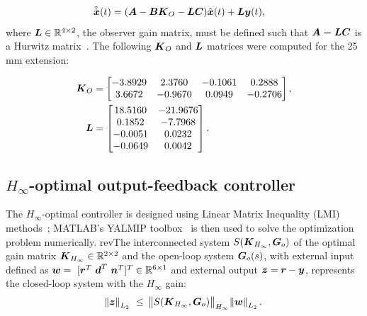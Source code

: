 \begin{align}
&\hat{\dot{\boldsymbol{x}}}(t)=(\boldsymbol{A}-\boldsymbol{B}\boldsymbol{K}_O-\boldsymbol{LC})\hat{\boldsymbol{x}}(t)+\boldsymbol{L}\boldsymbol{y}(t), \label{eq:obs-estimate}
\end{align}
where $\boldsymbol{L}\in \mathbb{R}^{4\times2}$, the observer gain matrix, must be defined such that $\boldsymbol{A-LC}$ is a Hurwitz matrix~\cite{aastrom2010}.
The following $\boldsymbol{K}_O$ and $\boldsymbol{L}$ matrices were computed for the 25\,mm extension: 

\begin{align*}
\boldsymbol{K}_O &=\begin{bmatrix}  
            -3.8929  & 2.3760   &  -0.1061  &  0.2888\\
             3.6672  & -0.9670  &   0.0949  & -0.2706
    \end{bmatrix},\\
\boldsymbol{L} &=\begin{bmatrix}
           18.5160 &  -21.9676\\   
            0.1852 &  -7.7968\\
           -0.0051 &   0.0232\\
           -0.0649 &   0.0042\\
    \end{bmatrix}.
\end{align*}

\subsection{$H_\infty$-optimal output-feedback controller}

The $H_\infty$-optimal controller is designed using Linear Matrix Inequality (LMI) methods~\cite{duan2013,boyd1994}; MATLAB's YALMIP toolbox~\cite{Lofberg2004} is then used to solve the optimization problem numerically. rev{The interconnected system $S(\boldsymbol{K}_{H_{\infty}},\boldsymbol{G}_o)$ of the optimal gain matrix $\boldsymbol{K}_{H_{\infty}}\in \mathbb{R}^{2\times2}$ and the open-loop system $\boldsymbol{G}_o(s)$, with external input defined as $\boldsymbol{w}=~[\boldsymbol{r}^T~\boldsymbol{d}^T~\boldsymbol{n}^T]^T \in \mathbb{R}^{6\times1}$ and external output $\boldsymbol{z}=\boldsymbol{r}-\boldsymbol{y}$, represents the closed-loop system with the ${H_{\infty}}$ gain:} \vspace{2mm}
\begin{align}
\norm{\boldsymbol{z}}_{L_2} ~\leq~ \norm{S(\boldsymbol{K}_{H_{\infty}},\boldsymbol{G}_o)}_{H_{\infty}} \norm{\boldsymbol{w}}_{L_2}.
\end{align}

